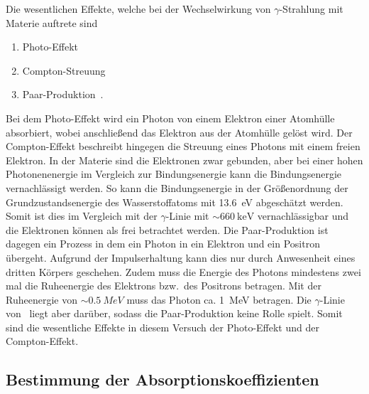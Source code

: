 Die wesentlichen Effekte, welche bei der Wechselwirkung von $\gamma$-Strahlung
mit Materie auftrete sind
\begin{enumerate}
  \item Photo-Effekt
  \item Compton-Streuung
  \item Paar-Produktion~.
\end{enumerate}
Bei dem Photo-Effekt wird ein Photon von einem Elektron einer Atomhülle
absorbiert, wobei anschließend das Elektron aus der Atomhülle gelöst wird.
Der Compton-Effekt beschreibt hingegen die Streuung eines Photons mit einem
freien Elektron. In der Materie sind die Elektronen zwar gebunden, aber bei
einer hohen Photonenenergie im Vergleich zur Bindungsenergie kann die
Bindungsenergie vernachlässigt werden. So kann die Bindungsenergie in der
Größenordnung der Grundzustandsenergie des Wasserstoffatoms mit \SI{13.6}{\eV}
abgeschätzt werden. Somit ist dies im Vergleich mit der $\gamma$-Linie mit
$\sim \SI{660}{\keV}$ vernachlässigbar und die Elektronen können als frei
betrachtet werden.
Die Paar-Produktion ist dagegen ein Prozess in dem ein Photon in ein Elektron
und ein Positron übergeht. Aufgrund der Impulserhaltung kann dies nur durch
Anwesenheit eines dritten Körpers geschehen. Zudem muss die Energie des Photons
mindestens zwei mal die Ruheenergie des Elektrons bzw.~des Positrons betragen.
Mit der Ruheenergie von $\sim \SI{0.5}{MeV}$ muss das Photon ca. \SI{1}{\MeV}
betragen. Die $\gamma$-Linie von \Cs~liegt aber darüber,
sodass die Paar-Produktion keine Rolle spielt.
Somit sind die wesentliche Effekte in diesem Versuch der Photo-Effekt und
der Compton-Effekt.

\subsection{Bestimmung der Absorptionskoeffizienten}
\label{sub:bestimmung_der_absorptionskoeffizienten}

